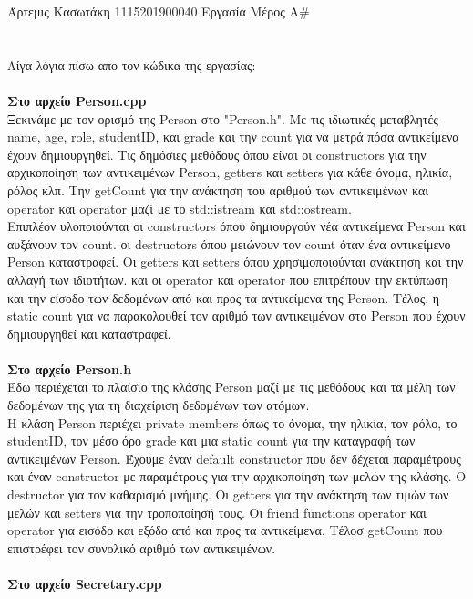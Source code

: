 \documentclass[12pt]{article}
\begin{document}
\noindent Άρτεμις Κασωτάκη 1115201900040 \hfill Εργασία Μέρος Α\#\\
\\
\\
Λίγα λόγια πίσω απο τον κώδικα της εργασίας:
\\ \\
\textbf{Στο αρχείο Person.cpp }
\\
Ξεκινάμε με τον ορισμό της Person στο "Person.h". Με τις ιδιωτικές μεταβλητές name, age, role, studentID, και grade και την count για να μετρά πόσα 
αντικείμενα έχουν δημιουργηθεί. Τις δημόσιες μεθόδους όπου είναι οι constructors για την αρχικοποίηση των αντικειμένων Person, getters και setters για κάθε όνομα, ηλικία, ρόλος κλπ.
Την  getCount για την ανάκτηση του αριθμού των αντικειμένων και 
operator \guillemotright{}  και operator \guillemotleft{} μαζί με το std::istream και std::ostream.
\\
Επιπλέον υλοποιούνται οι constructors όπου δημιουργούν νέα αντικείμενα Person και αυξάνουν τον count.
οι destructors όπου μειώνουν τον count όταν ένα αντικείμενο Person καταστραφεί.
Οι getters και setters όπου χρησιμοποιούνται ανάκτηση και την αλλαγή των ιδιοτήτων.
και οι operator \guillemotright{}  και operator \guillemotleft{} που επιτρέπουν την εκτύπωση και την είσοδο των δεδομένων από και προς τα αντικείμενα της Person.
Τέλος, η  static count για να παρακολουθεί τον αριθμό των αντικειμένων στο Person που έχουν δημιουργηθεί και καταστραφεί.
\\
\\
\textbf{Στο αρχείο Person.h }
\\
Έδω περιέχεται το πλαίσιο της κλάσης Person μαζί με τις
μεθόδους και τα μέλη των δεδομένων της για τη διαχείριση δεδομένων των ατόμων.
\\
Η κλάση Person περιέχει private members όπως το όνομα, την ηλικία, τον ρόλο, το studentID, τον μέσο όρο grade και μια static count 
για την καταγραφή των αντικειμένων Person.
Έχουμε έναν default constructor που δεν δέχεται παραμέτρους και έναν constructor με παραμέτρους για την αρχικοποίηση των μελών της κλάσης.
Ο destructor για τον καθαρισμό μνήμης.
Οι getters για την ανάκτηση των τιμών των μελών και setters για την τροποποίησή τους.
Οι friend functions operator \guillemotleft{} και operator \guillemotright{} για εισόδο και εξόδο από και προς τα αντικείμενα.
Τέλοσ getCount που επιστρέφει τον συνολικό αριθμό των αντικειμένων.\\
\\
\textbf{Στο αρχείο Secretary.cpp }
\\
\end{document}

